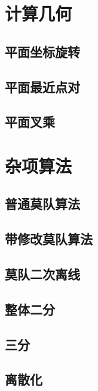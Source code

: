 \documentclass[twocolumn,a4]{article}  %
\begin{document}
	\section{计算几何}
		\subsection{平面坐标旋转}
	 	 	
	 	 	
		\subsection{平面最近点对}
	 	 	
	 	 	
	 	 \subsection{平面叉乘}
	 	 	
	
	\section{杂项算法}
		\subsection{普通莫队算法}
	 	 	
	 	 	
	 	\subsection{带修改莫队算法}
	 	 	
	 	 	
	 	\subsection{莫队二次离线}
	 	 	
	 	 	
	 	\subsection{整体二分}
	 	 	
	 	 	
	 	\subsection{三分}
	 	 	
	 	 	
	 	\subsection{离散化}
	 	 	
	 	 	
\end{document}
